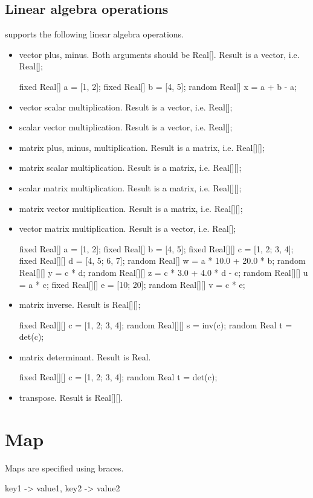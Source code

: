 \documentclass[12pt]{article}
\begin{document}
\subsection{Linear algebra operations}
\bl supports the following linear algebra operations.
\begin{itemize}
\item vector plus, minus. Both arguments should be Real[].  Result is a vector, i.e. Real[];
\begin{blogcode}
fixed Real[] a = [1, 2];
fixed Real[] b = [4, 5];
random Real[] x = a + b - a;
\end{blogcode}
\item vector scalar multiplication. Result is a vector, i.e. Real[];
\item scalar vector multiplication. Result is a vector, i.e. Real[];
\item matrix plus, minus, multiplication. Result is a matrix, i.e. Real[][];
\item matrix scalar multiplication. Result is a matrix, i.e. Real[][];
\item scalar matrix multiplication. Result is a matrix, i.e. Real[][];
\item matrix vector multiplication. Result is a matrix, i.e. Real[][];
\item vector matrix multiplication. Result is a vector, i.e. Real[];
\begin{blogcode}
fixed Real[] a = [1, 2];
fixed Real[] b = [4, 5];
fixed Real[][] c = [1, 2; 3, 4];
fixed Real[][] d = [4, 5; 6, 7];
random Real[] w = a * 10.0 + 20.0 * b;
random Real[][] y = c * d;
random Real[][] z = c * 3.0 + 4.0 * d - c;
random Real[][] u = a * c;
fixed Real[][] e = [10; 20];
random Real[][] v = c * e;
\end{blogcode}
\item matrix inverse. Result is Real[][];
\begin{blogcode}
fixed Real[][] c = [1, 2; 3, 4];
random Real[][] s = inv(c);
random Real t = det(c);
\end{blogcode}
\item matrix determinant. Result is Real.
\begin{blogcode}
fixed Real[][] c = [1, 2; 3, 4];
random Real t = det(c);
\end{blogcode}
\item transpose. Result is Real[][].
\end{itemize}

\section{Map}
Maps are specified using braces. 
\begin{blogcode}
{key1 -> value1, key2 -> value2}
\end{blogcode}
\end{document}
